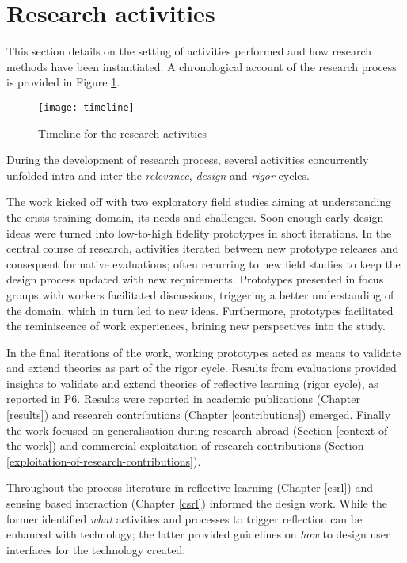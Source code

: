 \section{Research activities}\label{research-activities}

This section details on the setting of activities performed and how research methods have been instantiated. A chronological account of the research process is provided in Figure \ref{fig:research-activities}.
\begin{figure}
	[p] \centering 
	\texttt{[image: timeline]} \caption{Timeline for the research activities} \label{fig:research-activities} 
\end{figure}

During the development of research process, several activities concurrently unfolded intra and inter the \emph{relevance}, \emph{design} and \emph{rigor} cycles.

The work kicked off with two exploratory field studies aiming at understanding the crisis training domain, its needs and challenges. Soon enough early design ideas were turned into low-to-high fidelity prototypes in short iterations. In the central course of research, activities iterated between new prototype releases and consequent formative evaluations; often recurring to new field studies to keep the design process updated with new requirements. Prototypes presented in focus groups with workers facilitated discussions, triggering a better understanding of the domain, which in turn led to new ideas. Furthermore, prototypes facilitated the reminiscence of work experiences, brining new perspectives into the study.

In the final iterations of the work, working prototypes acted as means to validate and extend theories as part of the rigor cycle. Results from evaluations provided insights to validate and extend theories of reflective learning (rigor cycle), as reported in P6. Results were reported in academic publications (Chapter \ref{results}) and research contributions (Chapter \ref{contributions}) emerged. Finally the work focused on generalisation during research abroad (Section \ref{context-of-the-work}) and commercial exploitation of research contributions (Section \ref{exploitation-of-research-contributions}).

Throughout the process literature in reflective learning (Chapter \ref{csrl}) and sensing based interaction (Chapter \ref{csrl}) informed the design work. While the former identified \emph{what} activities and processes to trigger reflection can be enhanced with technology; the latter provided guidelines on \emph{how} to design user interfaces for the technology created.

